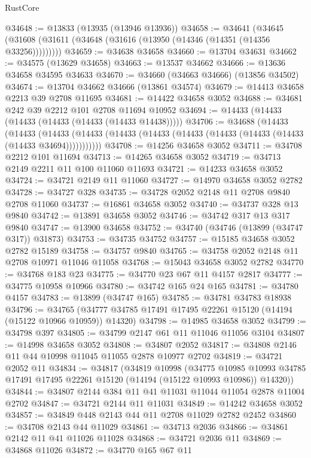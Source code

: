 \begin{lexlean}{RustCore}
\begin{coremodule}
@34648 := @13833 (@13935 (@13946 @13936))
@34658 := @34641
    (@34645 (@31608 (@31611 (@34648 (@31616 (@13950 (@14346 (@14351 (@14356 @33256)))))))))
@34659 := @34638 @34658
@34660 := @13704 @34631
@34662 := @34575 (@13629 @34658)
@34663 := @13537 @34662
@34666 := @13636 @34658 @34595 @34633
@34670 := @34660 (@34663 @34666) (@13856 @34502)
@34674 := @13704 @34662 @34666 (@13861 @34574)
@34679 := @14413 @34658 @2213 @39 @2708 @11695
@34681 := @14422 @34658 @3052
@34688 := @34681 @242 @39 @2212 @101 @2708 @11694 @10952
@34694 := @14433 (@14433 (@14433 (@14433 (@14433 (@14433 @14438)))))
@34706 := @34688
    (@14433
      (@14433
        (@14433 (@14433 (@14433 (@14433 (@14433 (@14433 (@14433 (@14433 (@14433 @34694)))))))))))
@34708 := @14256 @34658 @3052
@34711 := @34708 @2212 @101 @11694
@34713 := @14265 @34658 @3052
@34719 := @34713 @2149 @2211 @11 @100 @11060 @11693
@34721 := @14233 @34658 @3052
@34724 := @34721 @2149 @11 @11060
@34727 := @14970 @34658 @3052 @2782
@34728 := @34727 @328
@34735 := @34728 @2052 @2148 @11 @2708 @9840 @2708 @11060
@34737 := @16861 @34658 @3052
@34740 := @34737 @328 @13 @9840
@34742 := @13891 @34658 @3052
@34746 := @34742 @317 @13 @317 @9840
@34747 := @13900 @34658
@34752 := @34740 (@34746 (@13899 (@34747 @317)) @31873)
@34753 := @34735 @34752
@34757 := @15185 @34658 @3052 @2782 @15189
@34758 := @34757 @9840
@34765 := @34758 @2052 @2148 @11 @2708 @10971 @11046 @11058
@34768 := @15043 @34658 @3052 @2782
@34770 := @34768 @183 @23
@34775 := @34770 @23 @67 @11 @4157 @2817
@34777 := @34775 @10958 @10966
@34780 := @34742 @165 @24 @165
@34781 := @34780 @4157
@34783 := @13899 (@34747 @165)
@34785 := @34781 @34783 @18938
@34796 := @34765 (@34777 @34785 @17491 @17495 @22261 @15120 (@14194 (@15122 @10966 @10959)) @14320)
@34798 := @14985 @34658 @3052
@34799 := @34798 @397
@34805 := @34799 @2147 @61 @11 @11046 @11056 @3104
@34807 := @14998 @34658 @3052
@34808 := @34807 @2052
@34817 := @34808 @2146 @11 @44 @10998 @11045 @11055 @2878 @10977 @2702
@34819 := @34721 @2052 @11
@34834 := @34817
    (@34819
      @10998
      (@34775
        @10985
        @10993
        @34785
        @17491
        @17495
        @22261
        @15120
        (@14194 (@15122 @10993 @10986))
        @14320))
@34844 := @34807 @2144 @384 @11 @41 @11031 @11044 @11054 @2878 @11004 @2702
@34847 := @34721 @2144 @11 @11031
@34849 := @14242 @34658 @3052
@34857 := @34849 @448 @2143 @44 @11 @2708 @11029 @2782 @2452
@34860 := @34708 @2143 @44 @11029
@34861 := @34713 @2036
@34866 := @34861 @2142 @11 @41 @11026 @11028
@34868 := @34721 @2036 @11
@34869 := @34868 @11026
@34872 := @34770 @165 @67 @11

\end{coremodule}
\end{lexlean}
